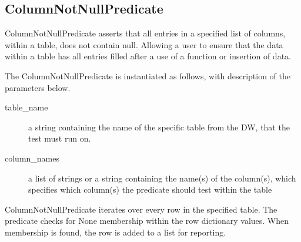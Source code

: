\subsection{ColumnNotNullPredicate}
ColumnNotNullPredicate asserts that all entries in a specified list of columns, within a table, does not contain null. Allowing a user to ensure that the data within a table has all entries filled after a use of a function or insertion of data.

The ColumnNotNullPredicate is instantiated as follows, with description of the parameters below.


\begin{description}
\item [table\_name] a string containing the name of the specific table from the DW, that the test must run on. 
\item [column\_names] a list of strings or a string containing the name(s) of the column(s), which specifies which column(s) the predicate should test within the table
\end{description}

ColumnNotNullPredicate iterates over every row in the specified table. The predicate checks for None membership within the row dictionary values. When membership is found, the row is added to a list for reporting.

